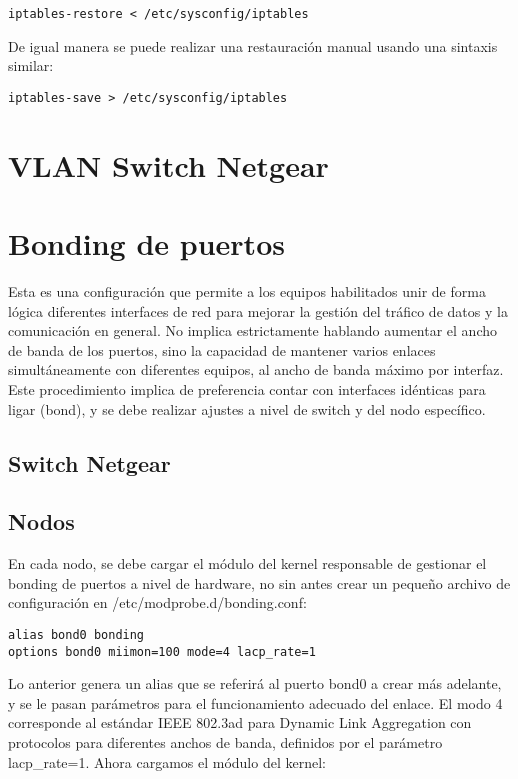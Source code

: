 \begin{lstlisting}
iptables-restore < /etc/sysconfig/iptables
\end{lstlisting}

De igual manera se puede realizar una restauración manual usando una sintaxis similar:

\begin{lstlisting}
iptables-save > /etc/sysconfig/iptables
\end{lstlisting}

\section{VLAN Switch Netgear}

\section{Bonding de puertos}
Esta es una configuración que permite a los equipos habilitados unir de forma lógica diferentes interfaces de red para mejorar la gestión del tráfico de datos y la comunicación en general. No implica estrictamente hablando aumentar el ancho de banda de los puertos, sino la capacidad de mantener varios enlaces simultáneamente con diferentes equipos, al ancho de banda máximo por interfaz. Este procedimiento implica de preferencia contar con interfaces idénticas para ligar (bond), y se debe realizar ajustes a nivel de switch y del nodo específico.
\subsection{Switch Netgear}

\subsection{Nodos}
En cada nodo, se debe cargar el módulo del kernel responsable de gestionar el bonding de puertos a nivel de hardware, no sin antes crear un pequeño archivo de configuración en /etc/modprobe.d/bonding.conf:

\begin{lstlisting}
alias bond0 bonding
options bond0 miimon=100 mode=4 lacp_rate=1
\end{lstlisting}

Lo anterior genera un alias que se referirá al puerto bond0 a crear más adelante, y se le pasan parámetros para el funcionamiento adecuado del enlace. El modo 4 corresponde al estándar IEEE 802.3ad para Dynamic Link Aggregation con protocolos para diferentes anchos de banda, definidos por el parámetro lacp\_rate=1. Ahora cargamos el módulo del kernel:

